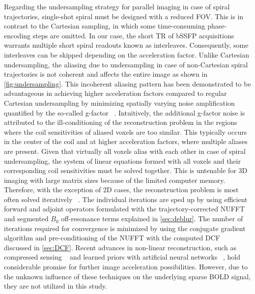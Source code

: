 Regarding the undersampling strategy for parallel imaging in case of spiral trajectories, single-shot spiral must be designed with a reduced \gls{FOV}. This is in contrast to the Cartesian sampling, in which some time-consuming phase-encoding steps are omitted. In our case, the short \gls{TR} of \gls{bSSFP} acquisitions warrants multiple short spiral readouts known as interleaves. Consequently, some interleaves can be skipped depending on the acceleration factor. Unlike Cartesian undersampling, the aliasing due to undersampling in case of non-Cartesian spiral trajectories is not coherent and affects the entire image as shown in \cref{fig:undersampling}. This incoherent aliasing pattern has been demonstrated to be advantageous in achieving higher acceleration factors compared to regular Cartesian undersampling by minimizing spatially varying noise amplification quantified by the so-called g-factor ~\cite{pruessmannSENSESensitivityEncoding1999,eggersNoiseAmplificationNonCartesian2005,leeSignaltonoiseRatioBenefit2021}. Intuitively, the additional g-factor noise is attributed to the ill-conditioning of the reconstruction problem in the regions where the coil sensitivities of aliased voxels are too similar. This typically occurs in the center of the coil and at higher acceleration factors, where multiple aliases are present. Given that virtually all voxels alias with each other in case of spiral undersampling, the system of linear equations formed with all voxels and their corresponding coil sensitivities must be solved together. This is untenable for 3D imaging with large matrix sizes because of the limited computer memory. Therefore, with the exception of 2D cases, the reconstruction problem is most often solved iteratively ~\cite{pruessmannAdvancesSensitivityEncoding2001}. The individual iterations are sped up by using efficient forward and adjoint operators formulated with the trajectory-corrected \gls{NUFFT} and segmented $B_0$ off-resonance terms explained in \cref{sec:deblur}. The number of iterations required for convergence is minimized by using the conjugate gradient algorithm and pre-conditioning of the \gls{NUFFT} with the computed \gls{DCF} ~\cite{pruessmannAdvancesSensitivityEncoding2001} discussed in \cref{sec:DCF}.  Recent advances in non-linear reconstruction, such as compressed sensing ~\cite{lustigSparseMRIApplication2007} and learned priors with artificial neural networks ~\cite{hammernikLearningVariationalNetwork2018,knollDeepLearningMethodsParallel2020}, hold considerable promise for further image acceleration possibilities. However, due to the unknown influence of these techniques on the underlying sparse BOLD signal, they are not utilized in this study. 

